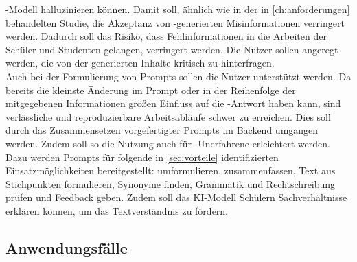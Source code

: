 \documentclass[../main.tex]{subfiles}
\begin{document}
-Modell halluzinieren können. Damit soll, ähnlich wie in der in \autoref{ch:anforderungen} behandelten Studie, die Akzeptanz von -generierten Misinformationen verringert werden. Dadurch 
soll das Risiko, dass Fehlinformationen in die Arbeiten der Schüler und Studenten gelangen, verringert werden. Die Nutzer sollen angeregt werden, die von der  generierten Inhalte 
kritisch zu hinterfragen.\\
Auch bei der Formulierung von Prompts sollen die Nutzer unterstützt werden. Da bereits die kleinste Änderung im Prompt oder in der Reihenfolge der mitgegebenen Informationen großen 
Einfluss auf die -Antwort haben kann, sind verlässliche und reproduzierbare Arbeitsabläufe schwer zu erreichen\cite{creativeWriting}. Dies soll durch das Zusammensetzen vorgefertigter 
Prompts im Backend umgangen werden. Zudem soll so die Nutzung auch für -Unerfahrene erleichtert werden. Dazu werden Prompts für folgende in \autoref{sec:vorteile} identifizierten 
Einsatzmöglichkeiten bereitgestellt: umformulieren, zusammenfassen, Text aus Stichpunkten formulieren, Synonyme finden, Grammatik und Rechtschreibung prüfen und Feedback geben. Zudem soll das KI-Modell
Schülern Sachverhältnisse erklären können, um das Textverständnis zu fördern. 


\subsection{Anwendungsfälle}
\end{document}
